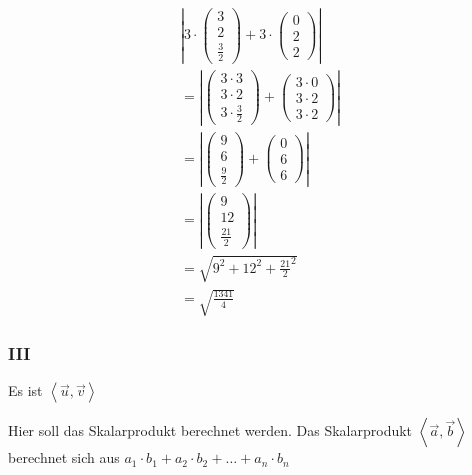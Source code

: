 \begin{align*}
    \left|3 \cdot \begin{pmatrix}
        3 \\ 2 \\ \frac{3}{2}
    \end{pmatrix} + 3 \cdot \begin{pmatrix}
        0 \\ 2 \\ 2
    \end{pmatrix}\right| \\
    = \left|\begin{pmatrix}
        3 \cdot 3 \\ 3 \cdot 2 \\ 3 \cdot \frac{3}{2}
    \end{pmatrix} + \begin{pmatrix}
        3 \cdot 0 \\ 3 \cdot 2 \\ 3 \cdot 2
    \end{pmatrix}\right| \\
    = \left|\begin{pmatrix}
        9 \\ 6 \\ \frac{9}{2}
    \end{pmatrix} + \begin{pmatrix}
        0 \\ 6 \\ 6
    \end{pmatrix}\right| \\
    = \left|\begin{pmatrix}
        9 \\ 12 \\ \frac{21}{2}
    \end{pmatrix}\right| \\
    = \sqrt{9^2 + 12^2 + \frac{21}{2}^2} \\
    = \sqrt{\frac{1341}{4}}
\end{align*}

\subsubsection{III}
Es ist $\left\langle\vec{u}, \vec{v}\right\rangle$

Hier soll das Skalarprodukt berechnet werden. Das Skalarprodukt $\left\langle\vec{a}, \vec{b}\right\rangle$
berechnet sich aus $a_1 \cdot b_1 + a_2 \cdot b_2 + \dots + a_n \cdot b_n$

